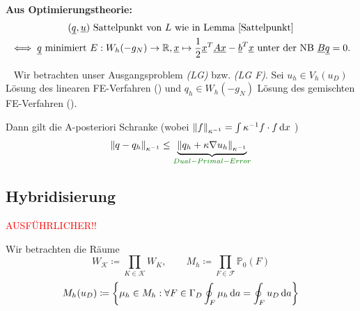 \textbf{Aus Optimierungstheorie:} 
\begin{gather*}
	(\underline{q}, \underline{u}) \text{ Sattelpunkt von } L  \text { wie in Lemma \ref{Sattelpunkt}}\\
	\iff \underline{q} \text{ minimiert } E:W_h(-g_N) \to \mathbb{R} , \underline{x} \mapsto \frac{1}{2} \underline{x}^T \underline{A} \underline{x} - \underline{b}^T \underline{x} \text{ unter der NB } \underline{B} \underline{q} = 0.
\end{gather*}

\begin{Satz} ~\newline
	Wir betrachten unser Ausgangsproblem \emph{(LG)} bzw. \emph{(LG F)}. Sei $ u_h \in V_h(u_D) $ Lösung des linearen FE-Verfahren () und $ q_h \in W_h(-g_N) $ Lösung des gemischten FE-Verfahren (). 
	
	Dann gilt die A-posteriori Schranke (wobei  $ \norm{f}_{\kappa^{-1}} = \int \kappa^{-1} f \cdot f \mathop{}\!\mathrm{d} x $ ) 
	\begin{gather*}
	\norm{q-q_h}_{\kappa^{-1}} \leq \underbrace{\norm{q_h + \kappa \nabla u_h}_{\kappa^{-1}}}_{\defi{Dual-Primal-Error}} 
	\end{gather*}
\end{Satz}


\subsection{Hybridisierung}

\textcolor{red}{AUSFÜHRLICHER!!}


Wir betrachten die Räume
\[ W_\mathcal{K} \coloneqq \prod_{K \in \mathcal{K}} W_K, \qquad M_h \coloneqq \prod_{F \in \mathcal{F}} \mathbb{P}_0(F) \]
\[ M_h(u_D) \coloneqq \left\{ \mu_h \in M_h:\forall  F \in \Gamma_D \oint_F \mu_h \mathop{}\!\mathrm{d} a = \oint_F u_D \mathop{}\!\mathrm{d} a  \right\}\]


